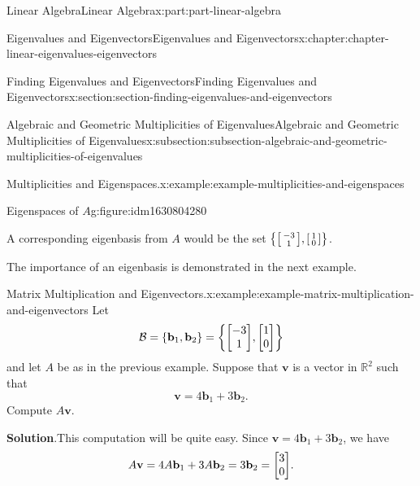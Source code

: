 \documentclass[twoside,10pt,]{book}
\newcommand{\blocktitlefont}{\relax}
\numberwithin{equation}{part}
\newcommand{\RR}{\mathbb{R}}
\providecommand{\vb}[1]{\mathbf{#1}}
\newcommand{\nul}[1]{\operatorname{null}{#1}}
\begin{document}
\begin{partptx}{Linear Algebra}{}{Linear Algebra}{}{}{x:part:part-linear-algebra}
\begin{chapterptx}{Eigenvalues and Eigenvectors}{}{Eigenvalues and Eigenvectors}{}{}{x:chapter:chapter-linear-eigenvalues-eigenvectors}
\begin{sectionptx}{Finding Eigenvalues and Eigenvectors}{}{Finding Eigenvalues and Eigenvectors}{}{}{x:section:section-finding-eigenvalues-and-eigenvectors}
\begin{subsectionptx}{Algebraic and Geometric Multiplicities of Eigenvalues}{}{Algebraic and Geometric Multiplicities of Eigenvalues}{}{}{x:subsection:subsection-algebraic-and-geometric-multiplicities-of-eigenvalues}
\begin{example}{Multiplicities and Eigenspaces.}{x:example:example-multiplicities-and-eigenspaces}
\begin{figureptx}{Eigenspaces of \(A\)}{g:figure:idm1630804280}{}%
\begin{image}{0}{1}{0}%
\resizebox{\linewidth}{!}{%
\begin{tikzpicture}[scale = 0.7]
\begin{axis}[
enlargelimits=false,
legend cell align=left,
axis x line = middle,
xlabel = $x_{1}$,
axis y line = center,
ylabel = $x_{2}$,
grid=both
]
\addplot[domain=-3:3,samples=200,blue]{(-1/3)*x};
\addlegendentry{$\nul A$}
\addplot[domain=-3:3,thick,samples=200,blue,dashed]{0};
\addlegendentry{$\nul(A-I)$}
\end{axis}
\end{tikzpicture}
}%
\end{image}%
\tcblower
\end{figureptx}%
A corresponding eigenbasis from \(A\) would be the set \(\qty{\smqty[-3\\1], \smqty[1\\0]}\).%
\end{example}
The importance of an eigenbasis is demonstrated in the next example.%
\begin{example}{Matrix Multiplication and Eigenvectors.}{x:example:example-matrix-multiplication-and-eigenvectors}%
Let%
\begin{equation*}
\mathcal{B} = \qty{\vb{b}_{1},\vb{b}_{2}} = \qty{\mqty[-3 \\ 1], \mqty[1 \\ 0]}
\end{equation*}
and let \(A\) be as in the previous example. Suppose that \(\vb{v}\) is a vector in \(\RR^{2}\) such that%
\begin{equation*}
\vb{v} = 4\vb{b}_{1}+3\vb{b}_{2}.
\end{equation*}
Compute \(A\vb{v}\).%
\par\smallskip%
\noindent\textbf{\blocktitlefont Solution}.\hypertarget{g:solution:idm1630809528}{}\quad{}This computation will be quite easy. Since \(\vb{v} = 4\vb{b}_{1}+3\vb{b}_{2}\), we have%
\begin{equation*}
A\vb{v} = 4A\vb{b}_{1}+3A\vb{b}_{2} = 3\vb{b}_{2} = \mqty[3 \\ 0].
\end{equation*}
%
\end{example}
\end{subsectionptx}
\end{sectionptx}
%
%
\typeout{************************************************}

\end{chapterptx}
\end{partptx}
\end{document}
